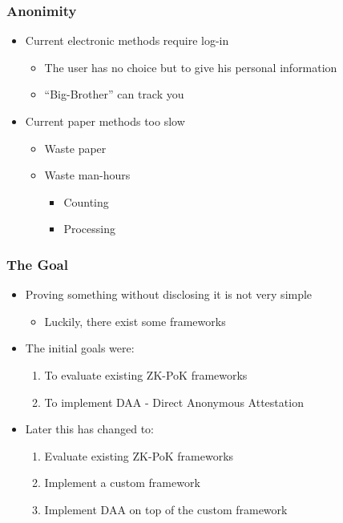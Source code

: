 \documentclass{beamer}
\begin{document}
\begin{frame}
  \frametitle{Anonimity}
  
  \begin{itemize}
  \item Current electronic methods require log-in
    \begin{itemize}
    \item The user has no choice but to give his personal information
    \item ``Big-Brother'' can track you
    \end{itemize}
  \item Current paper methods too slow
    \begin{itemize}
    \item Waste paper
    \item Waste man-hours
      \begin{itemize}
      \item Counting
      \item Processing
      \end{itemize}
    \end{itemize}
  \end{itemize}
\end{frame}

\begin{frame}
  \frametitle{The Goal}

  \begin{itemize}
  \item Proving something without disclosing it is not very simple
    \begin{itemize}
    \item Luckily, there exist some frameworks
    \end{itemize}
  \item The initial goals were:
    \begin{enumerate}
    \item To evaluate existing ZK-PoK frameworks
    \item To implement DAA - Direct Anonymous Attestation
    \end{enumerate}
  \item Later this has changed to:
    \begin{enumerate}
    \item Evaluate existing ZK-PoK frameworks
    \item Implement a custom framework
    \item Implement DAA on top of the custom framework
    \end{enumerate}
  \end{itemize}
\end{frame}
\end{document}
